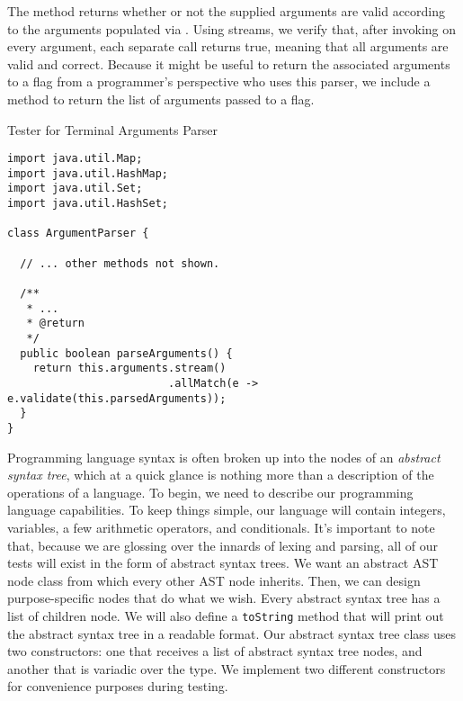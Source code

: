 The  method returns whether or not the supplied arguments are valid according to the arguments populated via . Using streams, we verify that, after invoking  on every argument, each separate call returns true, meaning that all arguments are valid and correct. Because it might be useful to return the associated arguments to a flag from a programmer's perspective who uses this parser, we include a  method to return the list of arguments passed to a flag.

\begin{cl}[]{Tester for Terminal Arguments Parser}
\begin{lstlisting}[language=MyJava]
import java.util.Map;
import java.util.HashMap;
import java.util.Set;
import java.util.HashSet;

class ArgumentParser {
  
  // ... other methods not shown.

  /**
   * ... 
   * @return
   */
  public boolean parseArguments() {
    return this.arguments.stream()
                         .allMatch(e -> e.validate(this.parsedArguments));
  }
}
\end{lstlisting}
\end{cl}


Programming language syntax is often broken up into the nodes of an \textit{abstract syntax tree}, which at a quick glance is nothing more than a description of the operations of a language. To begin, we need to describe our programming language capabilities. To keep things simple, our language will contain integers, variables, a few arithmetic operators, and conditionals. It's important to note that, because we are glossing over the innards of lexing and  parsing, all of our tests will exist in the form of abstract syntax trees. We want an abstract AST node class from which every other AST node inherits. Then, we can design purpose-specific nodes that do what we wish. Every abstract syntax tree has a list of children node. We will also define a \texttt{toString} method that will print out the abstract syntax tree in a readable format. Our abstract syntax tree class uses two constructors: one that receives a list of abstract syntax tree nodes, and another that is variadic over the  type. We implement two different constructors for convenience purposes during testing.

